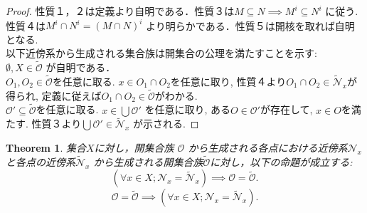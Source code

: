 \documentclass[lualatex]{ltjsbook}
\newtheorem{theorem}{Theorem}[section]
\theoremstyle{remark}
\theoremstyle{plain}
\begin{document}
\begin{proof}
	性質１，２は定義より自明である．性質３は$M\subseteq N \implies M^{i} \subseteq N^{i}$ に従う. 性質４は$M^{i}\cap N^{i} = \left( M \cap N \right) ^{i}$ より明らかである．性質５は開核を取れば自明となる.\\
	以下近傍系から生成される集合族は開集合の公理を満たすことを示す:\\
	$\emptyset ,X \in \tilde{\mathcal{O}}$ が自明である．\\
	$O_1 ,O_2 \in \tilde{\mathcal{O}}$を任意に取る. 
	$x \in O_1 \cap O_2$を任意に取り, 性質４より$O_1 \cap O_2 \in \mathcal{\tilde{N}}_x$が得られ, 定義に従えば$O_1 \cap O_2 \in \tilde{\mathcal{O}}$がわかる.\\
	$\mathcal{O}' \subseteq \tilde{\mathcal{O}}$を任意に取る.
	$x \in \bigcup \mathcal{O}'  $ を任意に取り,
	ある$O \in \mathcal{O}'$が存在して, $x \in O$を満たす. 性質３より$\bigcup \mathcal{O}' \in \mathcal{\tilde{N}}_x$ が示される.
\end{proof}

\begin{theorem}
	集合$X$に対し，開集合族 $\mathcal{O}$ から生成される各点における近傍系$\mathcal{N}_x$ 
	と各点の近傍系$\mathcal{\tilde{N}}_x$ から生成される開集合族$\tilde{\mathcal{O}}$に対し，以下の命題が成立する:
	\[
		\left( \forall x \in X; \mathcal{N}_x = \mathcal{\tilde{N}}_x \right) \implies \mathcal{O} = \tilde{\mathcal{O}}
	.\] 
	\[
	\mathcal{O} = \tilde{\mathcal{O}} \implies \left( \forall x \in X; \mathcal{N}_x = \mathcal{\tilde{N}}_x \right)
	.\] 
\end{theorem}
\end{document}
